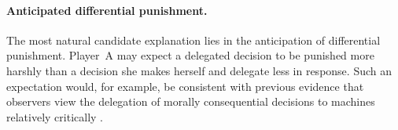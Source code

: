 \paragraph{Anticipated differential punishment.} The most natural candidate explanation lies in the anticipation of differential punishment. Player~A may expect a delegated decision to be punished more harshly than a decision she makes herself and delegate less in response. Such an expectation would, for example, be consistent with previous evidence that observers view the delegation of morally consequential decisions to machines relatively critically \citep[e.g.,][]{gogoll_rage_2018, bigman_people_2018, jauernig_people_2022, bonnefon_moral_2024}.



